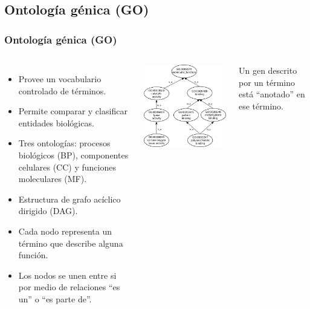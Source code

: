 \documentclass[serif,9pt, t]{beamer}
\newcommand\Fontvi{\fontsize{7}{7.2}\selectfont}
\begin{document}
\subsection{Ontología génica (GO)}
\begin{frame}\frametitle{Ontología génica (GO)}
\begin{columns}[T]
	\begin{itemize}
		\item Provee un vocabulario controlado de términos.
		\item Permite comparar y clasificar entidades biológicas.
		\item Tres ontologías: procesos biológicos (BP), componentes celulares (CC) y funciones moleculares (MF).
		\item Estructura de grafo acíclico dirigido (DAG).
		\item Cada nodo representa un término que describe alguna función.
		\item Los nodos se unen entre si por medio de relaciones ``es un'' o ``es parte de''.
	\end{itemize}
	\centering
	\includegraphics[width=1\textwidth]{ejemplo_de_go.jpg}	
	
	\medskip
	\Fontvi
	Un gen descrito por un término está ``anotado'' en ese término.	
\end{columns}
\end{frame}
\end{document}
